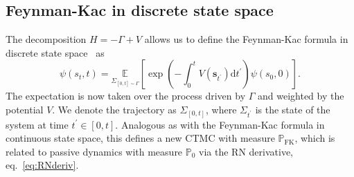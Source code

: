 \subsection{Feynman-Kac in discrete state space}
The decomposition $H = -\Gamma + V$ allows us to define the Feynman-Kac formula in discrete state space~\cite{rogers2000diffusions} as
\begin{equation}
	\label{eq:fkac_disc}
	\psi\left(s_t, t\right)=
	\underset{\Sigma_{[0, t] \sim \Gamma}}{\mathbb{E}}
	\left[
	\exp \left(-\int_{0}^{t} V\left(\boldsymbol{s}_{t^{\prime}}\right) \mathrm{d} t^{\prime}\right) \psi\left(s_0, 0\right)
	\right].
\end{equation}
The expectation is now taken over the process driven by $\Gamma$ and weighted by the potential $V$. We denote the trajectory as $\Sigma_{[0, t]}$, where $\Sigma_{t^\prime}$ is the state of the system at time $t^\prime \in [0, t]$. Analogous as with the Feynman-Kac formula in continuous state space, this defines a new CTMC with measure $\mathbb{P}_{\text{FK}}$, which is related to  passive dynamics with measure $\mathbb{P}_0$ via the RN derivative, eq.~\eqref{eq:RNderiv}.

